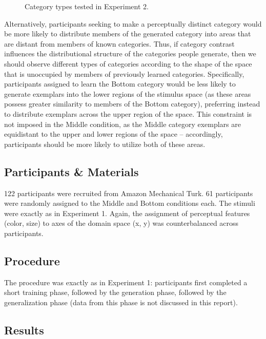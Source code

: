 \documentclass[12pt]{article}
\begin{document}
\begin{flushleft}
\begin{figure}
    \begin{center}
    
    \caption{Category types tested in Experiment 2.}
    \label{fig:e2-conditions}
    \end{center}
\end{figure}


Alternatively, participants seeking to make a perceptually distinct category would be more likely to distribute members of the generated category into areas that are distant from members of known categories. Thus, if category contrast influences the distributional structure of the categories people generate, then we should observe different types of categories according to the shape of the space that is unoccupied by members of previously learned categories. Specifically, participants assigned to learn the Bottom category would be less likely to generate exemplars into the lower regions of the stimulus space (as these areas possess greater similarity to members of the Bottom category), preferring instead to distribute exemplars across the upper region of the space. This constraint is not imposed in the Middle condition, as the Middle category exemplars are equidistant to the upper and lower regions of the space -- accordingly, participants should be more likely to utilize both of these areas.


\subsection{Participants \& Materials}

122 participants were recruited from Amazon Mechanical Turk. 61 participants were randomly assigned to the Middle and Bottom conditions each. The stimuli were exactly as in Experiment 1. Again, the assignment of perceptual features (color, size) to axes of the domain space (x, y) was counterbalanced across participants.

\subsection{Procedure}

The procedure was exactly as in Experiment 1: participants first completed a short training phase, followed by the generation phase, followed by the generalization phase (data from this phase is not discussed in this report).


\subsection{Results}



\end{flushleft}
\end{document}
